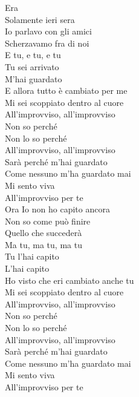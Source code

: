 \documentclass[letter,11pt]{article}
\begin{document}
\begin{multicols}{2}

\noindent Era \\
Solamente ieri sera \\
Io parlavo con gli amici \\
Scherzavamo fra di noi  \\

\noindent E tu, e tu, e tu \\
Tu sei arrivato \\
M'hai guardato \\
E allora tutto è cambiato per me \\

\noindent Mi sei scoppiato dentro al cuore \\
All'improvviso, all'improvviso \\
Non so perché \\
Non lo so perché \\
All'improvviso, all'improvviso \\

\noindent Sarà perché m'hai guardato  \\
Come nessuno m'ha guardato mai \\
Mi sento viva \\
All'improvviso per te \\

\noindent Ora
Io non ho capito ancora \\
Non so come può finire \\
Quello che succederà \\

\noindent Ma tu, ma tu, ma tu \\
Tu l'hai capito \\
L'hai capito \\
Ho visto che eri cambiato anche tu \\

\noindent Mi sei scoppiato dentro al cuore \\
All'improvviso, all'improvviso \\
Non so perché \\
Non lo so perché \\
All'improvviso, all'improvviso \\

\noindent Sarà perché m'hai guardato \\
Come nessuno m'ha guardato mai \\
Mi sento viva \\
All'improvviso per te \\


\end{multicols}
\end{document}
